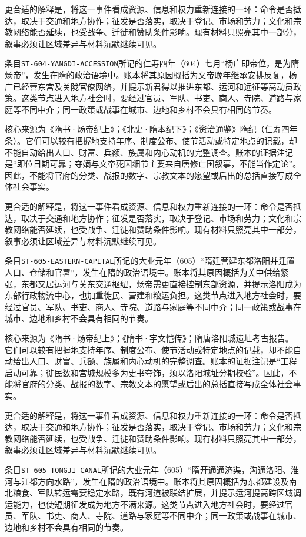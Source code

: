 更合适的解释是，将这一事件看成资源、信息和权力重新连接的一环：命令是否抵达，取决于交通和地方协作；征发是否落实，取决于登记、市场和劳力；文化和宗教网络能否延续，也受战争、迁徙和赞助条件影响。现有材料只照亮其中一部分，叙事必须让区域差异与材料沉默继续可见。

条目\texttt{ST-604-YANGDI-ACCESSION}所记的仁寿四年（604）七月“杨广即帝位，是为隋炀帝”，发生在隋的政治语境中。账本将其原因概括为文帝晚年继承安排反复，杨广已经营东宫及关陇官僚网络，并提示新君得以推进东都、运河和远征等高动员政策。这类节点进入地方社会时，要经过官员、军队、书吏、商人、寺院、道路与家庭等不同中介；同一政策或战事在城市、边地和乡村不会具有相同的节奏。

核心来源为《隋书·炀帝纪上》；《北史·隋本纪下》；《资治通鉴》隋纪（仁寿四年条）。它们可以较有把握地支持年序、制度公布、使节活动或特定地点的记载，却不能自动给出人口、财富、兵额、族属和内心动机的完整调查。账本的证据注记是“即位日期可靠；夺嫡与文帝死因细节主要来自唐修亡国叙事，不能当作定论”。因此，不能将官府的分类、战报的数字、宗教文本的愿望或后出的总括直接写成全体社会事实。

更合适的解释是，将这一事件看成资源、信息和权力重新连接的一环：命令是否抵达，取决于交通和地方协作；征发是否落实，取决于登记、市场和劳力；文化和宗教网络能否延续，也受战争、迁徙和赞助条件影响。现有材料只照亮其中一部分，叙事必须让区域差异与材料沉默继续可见。

条目\texttt{ST-605-EASTERN-CAPITAL}所记的大业元年（605）“隋廷营建东都洛阳并迁置人口、仓储和官署”，发生在隋的政治语境中。账本将其原因概括为关中供给紧张，东都又居运河与关东交通枢纽，炀帝需更直接控制东部资源，并提示洛阳成为东部行政物流中心，也加重徙民、营建和粮运负担。这类节点进入地方社会时，要经过官员、军队、书吏、商人、寺院、道路与家庭等不同中介；同一政策或战事在城市、边地和乡村不会具有相同的节奏。

核心来源为《隋书·炀帝纪上》；《隋书·宇文恺传》；隋唐洛阳城遗址考古报告。它们可以较有把握地支持年序、制度公布、使节活动或特定地点的记载，却不能自动给出人口、财富、兵额、族属和内心动机的完整调查。账本的证据注记是“工程启动可靠；徙民数和宫城规模多为史书夸饰，须以洛阳城址分期校验”。因此，不能将官府的分类、战报的数字、宗教文本的愿望或后出的总括直接写成全体社会事实。

更合适的解释是，将这一事件看成资源、信息和权力重新连接的一环：命令是否抵达，取决于交通和地方协作；征发是否落实，取决于登记、市场和劳力；文化和宗教网络能否延续，也受战争、迁徙和赞助条件影响。现有材料只照亮其中一部分，叙事必须让区域差异与材料沉默继续可见。

条目\texttt{ST-605-TONGJI-CANAL}所记的大业元年（605）“隋开通通济渠，沟通洛阳、淮河与江都方向水路”，发生在隋的政治语境中。账本将其原因概括为东都建设及南北粮食、军队转运需要稳定水路，既有河道被联结扩展，并提示运河提高跨区域调运能力，也使短期征发成为地方不满来源。这类节点进入地方社会时，要经过官员、军队、书吏、商人、寺院、道路与家庭等不同中介；同一政策或战事在城市、边地和乡村不会具有相同的节奏。

